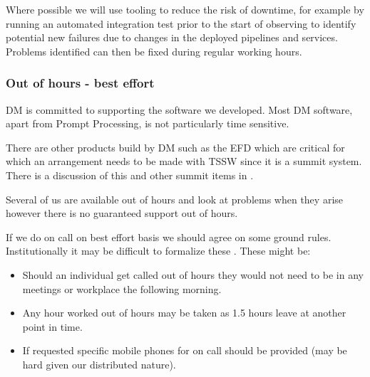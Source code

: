 Where possible we will use tooling to reduce the risk of downtime, for example by running an automated integration test prior to the start of observing to identify potential new failures due to changes in the deployed pipelines and services.
Problems identified can then be fixed during regular working hours.

\subsubsection{Out of hours - best effort}
DM is committed to supporting the software we developed.
Most DM software, apart from Prompt Processing, is not particularly time sensitive.

There are other products build by DM such as the EFD which are critical for which an arrangement needs to be made with TSSW since it is a summit system. There is a discussion of this and other summit items in .

Several of us are available out of hours and look at problems when they arise however there is no guaranteed support out of hours.


If we do on call on best effort basis we should agree on some ground rules.
Institutionally it may be difficult to formalize these .
These might be:

\begin{itemize}
\item Should an individual get called out of hours they would not need to be in any meetings or workplace the following morning.
\item Any hour worked out of hours may be taken as 1.5 hours leave at another point in time.
\item If requested specific mobile phones for on call should be provided (may be hard given our distributed nature).
\end{itemize}


